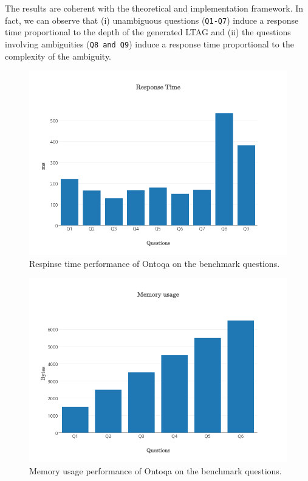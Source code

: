The results are coherent with the theoretical and implementation framework. In fact, we can observe that (i) unambiguous questions (\texttt{Q1-Q7}) induce a response time proportional to the depth of the generated LTAG and (ii) the questions involving ambiguities (\texttt{Q8 and Q9}) induce a response time proportional to the complexity of the ambiguity.

\begin{figure}[tp]
	\centering
	\includegraphics[width=0.8\columnwidth]{./fig/evaluation-response-time}
	\caption{Respinse time performance of Ontoqa on the benchmark questions.}
	\label{fig:evaluation-time}
\end{figure}

\begin{figure}[tp]
	\centering
	\includegraphics[width=0.8\columnwidth]{./fig/evaluation-memory-usage}
	\caption{Memory usage performance of Ontoqa on the benchmark questions.}
	\label{fig:evaluation-memory}
\end{figure}